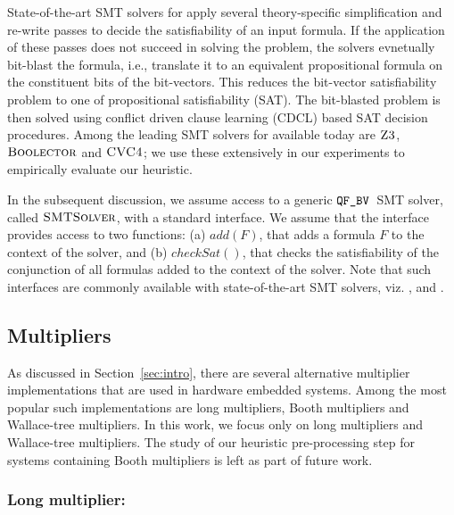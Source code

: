 
%
State-of-the-art SMT solvers for {\qfbv} apply several theory-specific
simplification and re-write passes to decide the satisfiability of an
input {\qfbv} formula.  If the application of these passes does not
succeed in solving the problem, the solvers evnetually bit-blast the
formula, i.e., translate it to an equivalent propositional formula on
the constituent bits of the bit-vectors.  This reduces the bit-vector
satisfiability problem to one of propositional satisfiability (SAT).
%
The bit-blasted problem is then solved using conflict driven clause
learning (CDCL)\cite{cdcl1,cdcl2} based SAT decision procedures.
%
Among the leading SMT solvers for {\qfbv} available today are
$\textsc{Z3}$\cite{zthree}, $\textsc{Boolector}$\cite{boolector} and
$\textsc{CVC4}$\cite{cvcfour}; we use these extensively in our experiments
to empirically evaluate our heuristic.

In the subsequent discussion, we assume access to a generic
$\texttt{QF\_BV}$~SMT solver, called $\textsc{SMTSolver}$, with a standard
interface.
%
We assume that the interface provides access to two functions: (a)
$add(F)$, that adds a formula $F$ to the context of the solver, and
(b) $checkSat()$, that checks the satisfiability of the conjunction of
all formulas added to the context of the solver.
%
Note that such interfaces are commonly available with state-of-the-art
SMT solvers, viz. {\boolector}, {\cvcfour} and {\zthree}.

\subsection{Multipliers}

As discussed in Section~\ref{sec:intro}, there are several alternative
multiplier implementations that are used in hardware embedded
systems.
%
Among the most popular such implementations are long
multipliers, Booth multipliers and Wallace-tree multipliers.
%
In this work, we focus only on long multipliers and Wallace-tree
multipliers.
%
The study of our heuristic pre-processing step for systems containing
Booth multipliers is left as part of future work.
 
\vspace{-3ex}
\subsubsection{Long multiplier:}\label{sec:long-mult}

